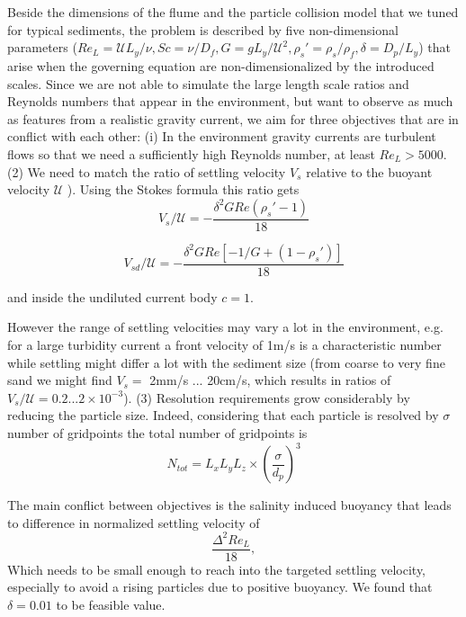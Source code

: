 \documentclass[10pt]{article}
\newcommand{\beq}{\begin{equation}}
\newcommand{\eeq}{ \end{equation} }
\begin{document}
Beside the dimensions of the flume and the particle collision model that we tuned for  typical sediments, the problem is described by five non-dimensional parameters ($Re_L = \mathcal U L_y/ \nu, Sc = \nu/ D_f, G = g L_y/ \mathcal U^2, \rho_s'=\rho_s / \rho_f, \delta = D_p/L_y$) that arise when the governing equation are non-dimensionalized by the introduced scales. Since we are not able to simulate the large length scale ratios and Reynolds numbers that appear in the environment, but want  to observe as much as features from a realistic gravity current, we aim for three objectives that are in conflict with each other: (i) In the environment gravity currents are turbulent flows so that we need a sufficiently high Reynolds number, at least $Re_L > 5000$.  (2)   We need to match the ratio of settling velocity $ V_s$ relative to the buoyant velocity $\mathcal U$ \citep{imran2017froude} ). Using the  Stokes formula this ratio gets
\beq
V_s/ \mathcal U= -\dfrac{\delta^2 G Re( \rho_s'-1)}{18}
\eeq

\beq
V_{sd}/ \mathcal U= -\dfrac{\delta^2 G Re[-1/G + ( 1- \rho_s' )]}{18}
\eeq

and inside the undiluted current body $c=1$.

However the range of settling velocities may vary a lot in the environment, e.g. for a large turbidity current a front velocity of  1m/s is a characteristic number while settling might differ a lot with the sediment size (from coarse to very fine sand we might find $ V_s=$ 2mm/s ... 20cm/s, which results in ratios of $ V_s/ \mathcal U= 0.2 ... 2 \times 10 ^ {-3}$). %
 (3) Resolution requirements grow considerably by reducing the particle size. Indeed, considering that each particle is resolved  by $\sigma$ number of gridpoints the total number of gridpoints is
 \beq
 N_{tot} =  L_xL_yL_z \times \left( \frac{\sigma}{d_p} \right)^3 \label{eq:gridpoints:erosion}
 \eeq 
  
 The main conflict between objectives is the salinity induced buoyancy that leads to  difference in normalized settling velocity of 
\beq
\frac{\Delta^2 Re_L}{18}, \label{eq:settdiff}
\eeq
Which needs to be small enough to reach into the targeted settling velocity, especially to avoid a rising particles due to positive buoyancy. We found that $\delta = 0.01$ to be feasible value. 

 
 
\end{document}
